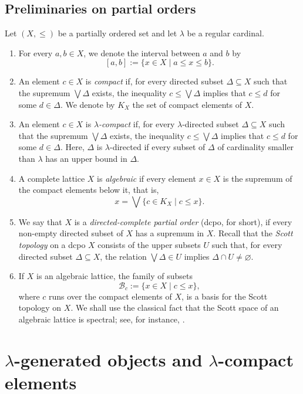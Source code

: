 \documentclass{amsproc}
\theoremstyle{definition}
\theoremstyle{plain}
\theoremstyle{remark}
\numberwithin{equation}{section}
\newcommand{\Cal}[1]{{\mathcal #1}}
\begin{document}
\subsection{Preliminaries on partial orders}\label{order-definitions}
Let $(X,\leq)$ be a partially ordered set and let $\lambda$ be a regular cardinal.
\begin{enumerate}
    \item
    For every $a,b \in X$, we denote the interval between $a$ and $b$ by
    $$
    [a,b]:=\{x \in X \mid a\leq x\leq b\}.
    $$
    \item
    An element $c\in X$ is \emph{compact} if, for every directed subset $\Delta\subseteq X$ such that the supremum $\bigvee\Delta$ exists, the inequality $c\leq\bigvee\Delta$ implies that $c\leq d$ for some $d\in\Delta$. We denote by $K_X$ the set of compact elements of $X$.
    \item
    An element $c\in X$ is \emph{$\lambda$-compact} if, for every $\lambda$-directed subset $\Delta\subseteq X$ such that the supremum $\bigvee\Delta$ exists, the inequality $c\leq\bigvee\Delta$ implies that $c\leq d$ for some $d\in\Delta$. Here, $\Delta$ is $\lambda$-directed if every subset of $\Delta$ of cardinality smaller than $\lambda$ has an upper bound in $\Delta$.
    \item
    A complete lattice $X$ is \emph{algebraic} if every element $x\in X$ is the supremum of the compact elements below it, that is,
    $$
    x=\bigvee\{c\in K_X\mid c\leq x\}.
    $$
    \item 
    We say that $X$ is a {\em directed-complete partial order} (dcpo, for short), if every non-empty directed subset of $X$ has a supremum in $X$. Recall that the \emph{Scott topology} on a dcpo $X$ consists of the upper subsets $U$ such that, for every directed subset $\Delta\subseteq X$, the relation $\bigvee\Delta\in U$ implies $\Delta\cap U\neq\varnothing$.
    \item
    If $X$ is an algebraic lattice, the family of subsets 
    $$
    \Cal B_c:=\{x \in X \mid c\leq x\},
    $$
    where $c$ runs over the compact elements of $X$, is a basis for the Scott topology on $X$. We shall use the classical fact that the Scott space of an algebraic lattice is spectral; see, for instance, \cite[Chapter~II]{Gierz2003}.
\end{enumerate}

\section{$\lambda$-generated objects and $\lambda$-compact elements}
\end{document}
